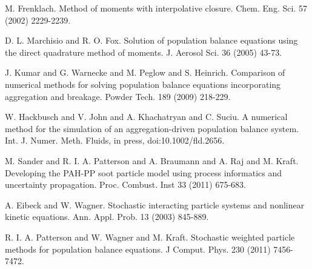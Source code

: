 
\begin{thebibliography}{10}

{\sc M. Frenklach}. {Method of moments with interpolative closure}. Chem. Eng. Sci. 57 (2002) 2229-2239.



{\sc D. L. Marchisio and R. O. Fox}. {Solution of population balance equations using the direct quadrature method of moments}. J. Aerosol Sci. 36 (2005) 43-73.



{\sc J. Kumar and G. Warnecke and M. Peglow and S. Heinrich}. {Comparison of numerical methods for solving population balance equations incorporating aggregation and breakage}. Powder Tech. 189 (2009) 218-229.



{\sc W. Hackbusch and V. John and A. Khachatryan and C. Suciu}. {A numerical method for the simulation of an aggregation-driven population balance system}. Int. J. Numer. Meth. Fluids, in press, doi:10.1002/fld.2656.



{\sc M. Sander and R. I. A. Patterson and A. Braumann and A. Raj and M. Kraft}. {Developing the PAH-PP soot particle model using process informatics and uncertainty propagation}. Proc. Combust. Inst 33 (2011) 675-683.



{\sc A. Eibeck and W. Wagner}. {Stochastic interacting particle systems and nonlinear kinetic equations}. Ann. Appl. Prob. 13 (2003) 845-889.



{\sc R. I. A. Patterson and W. Wagner and M. Kraft}. {Stochastic weighted particle methods for population balance equations}. J Comput. Phys. 230 (2011) 7456-7472.

\end{thebibliography}
